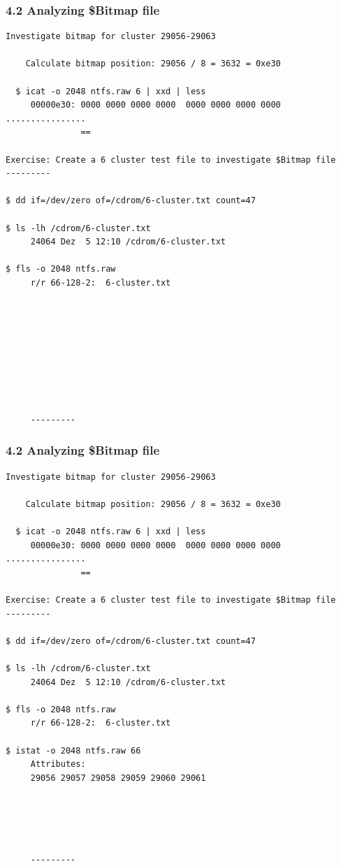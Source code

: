 \begin{frame}[fragile]
  \frametitle{4.2 Analyzing \$Bitmap file}
  \begin{lstlisting}[basicstyle=\tiny]
Investigate bitmap for cluster 29056-29063

    Calculate bitmap position: 29056 / 8 = 3632 = 0xe30
  
  $ icat -o 2048 ntfs.raw 6 | xxd | less
     00000e30: 0000 0000 0000 0000  0000 0000 0000 0000  ................
               ==

Exercise: Create a 6 cluster test file to investigate $Bitmap file
---------

$ dd if=/dev/zero of=/cdrom/6-cluster.txt count=47

$ ls -lh /cdrom/6-cluster.txt 
     24064 Dez  5 12:10 /cdrom/6-cluster.txt

$ fls -o 2048 ntfs.raw
     r/r 66-128-2:	6-cluster.txt









     ---------
  \end{lstlisting}
\end{frame}


\begin{frame}[fragile]
  \frametitle{4.2 Analyzing \$Bitmap file}
  \begin{lstlisting}[basicstyle=\tiny]
Investigate bitmap for cluster 29056-29063

    Calculate bitmap position: 29056 / 8 = 3632 = 0xe30
  
  $ icat -o 2048 ntfs.raw 6 | xxd | less
     00000e30: 0000 0000 0000 0000  0000 0000 0000 0000  ................
               ==

Exercise: Create a 6 cluster test file to investigate $Bitmap file
---------

$ dd if=/dev/zero of=/cdrom/6-cluster.txt count=47

$ ls -lh /cdrom/6-cluster.txt 
     24064 Dez  5 12:10 /cdrom/6-cluster.txt

$ fls -o 2048 ntfs.raw
     r/r 66-128-2:	6-cluster.txt

$ istat -o 2048 ntfs.raw 66
     Attributes: 
     29056 29057 29058 29059 29060 29061

     



     ---------
  \end{lstlisting}
\end{frame}


